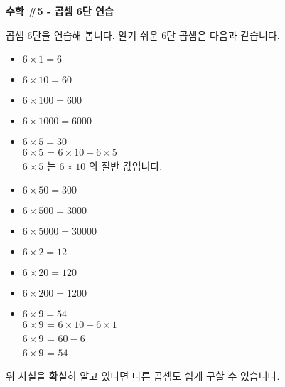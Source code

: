 \documentclass[a4paper,15pt]{exam}
\begin{document}
\fontsize{13pt}{20pt}\selectfont

\begin{center}
  \bfseries\LARGE
  수학 \#5 - 곱셈 6단 연습
  \bigskip
  \normalfont\normalsize
\end{center}


곱셈 6단을 연습해 봅니다. 알기 쉬운 6단 곱셈은 다음과 같습니다. 
\begin{itemize}
    \item $ 6 \times 1 = 6 $
    \item $ 6 \times 10 = 60 $
    \item $ 6 \times 100 = 600 $
    \item $ 6 \times 1000 = 6000 $
    \item $ 6 \times 5 = 30 $ \\
        $ 6 \times 5 $ = $ 6 \times 10 - 6 \times 5 $ \\
        $ 6 \times 5 $ 는 $ 6 \times 10 $ 의 절반 값입니다.
    \item $ 6 \times 50 = 300 $
    \item $ 6 \times 500 = 3000 $
    \item $ 6 \times 5000 = 30000 $
    \item $ 6 \times 2 = 12 $
    \item $ 6 \times 20 = 120 $ 
    \item $ 6 \times 200 = 1200 $
    \item $ 6 \times 9 = 54 $ \\
        $ 6 \times 9 $ = $ 6 \times 10 - 6 \times 1 $ \\
        $ 6 \times 9 $ = $ 60 - 6 $ \\
        $ 6 \times 9 $ = $ 54 $ \\
\end{itemize}

위 사실을 확실히 알고 있다면 다른 곱셈도 쉽게 구할 수 있습니다.
\end{document}
